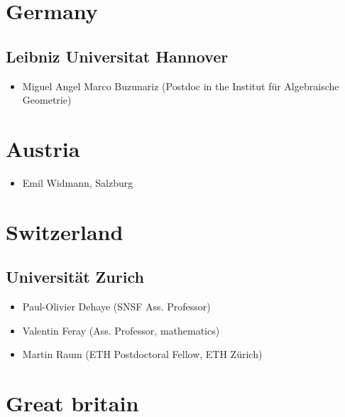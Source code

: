 \newcommand{\cs}{computer science}
\newcommand{\math}{mathematics}

\section*{Germany}

\subsection*{Leibniz Universitat Hannover}
\begin{itemize}
\item Miguel Angel Marco Buzunariz (Postdoc in the Institut für Algebraische Geometrie)
\end{itemize}

\section*{Austria}

\begin{itemize}
\item Emil Widmann, Salzburg
\end{itemize}

\section{Switzerland}
\subsection*{Universität Zurich}
\begin{itemize}
\item Paul-Olivier Dehaye (SNSF Ass. Professor)
\item Valentin Feray (Ass. Professor, \math)
\item Martin Raum (ETH Postdoctoral Fellow, ETH Zürich)
\end{itemize}

\section*{Great britain}

